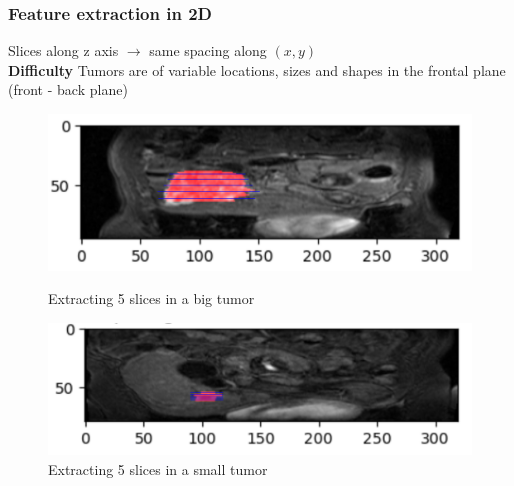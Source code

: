 \documentclass{beamer}
\begin{document}
\begin{frame}
    \frametitle{Feature extraction in 2D}
    \vspace{5 pt}
    Slices along z axis $\rightarrow$ same spacing along $(x,y)$\\[5 pt]
    \textbf{Difficulty} Tumors are of variable locations, sizes and shapes in the frontal plane (front - back plane)
    \begin{figure}
        \begin{minipage}{0.45\textwidth}
            \centering
            \includegraphics[scale = 0.125]{images/slices_big.png}
            \caption{Extracting 5 slices in a big tumor}
        \end{minipage}
        \hspace{0.03\textwidth} 
        \begin{minipage}{0.45\textwidth}
            \centering
            \includegraphics[scale = 0.18]{images/slices_small.png}
            \caption{Extracting 5 slices in a small tumor}
        \end{minipage}
    \end{figure}
\end{frame}
\end{document}

